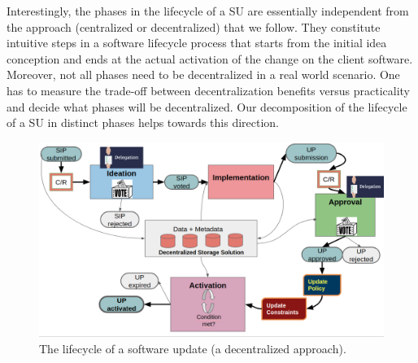 Interestingly, the phases in the lifecycle of a SU are essentially independent
from the approach (centralized or decentralized) that we follow. They
constitute intuitive steps in a software lifecycle process that starts from the
initial idea conception and ends at the actual activation of the change on the
client software.
Moreover, not all phases need to be decentralized in a real world scenario. One
has to measure the trade-off between decentralization benefits versus
practicality and decide what phases will be decentralized. Our decomposition of
the lifecycle of a SU in distinct phases helps towards this direction.


\begin{figure}[h!] %
	\centering
	\includegraphics[width=0.8\columnwidth,
	keepaspectratio]{figures/software_update_lifecycle.png}
	\caption{The lifecycle of a software update (a decentralized approach).}
	\label{fig:dsu_lifecycle}
\end{figure}


